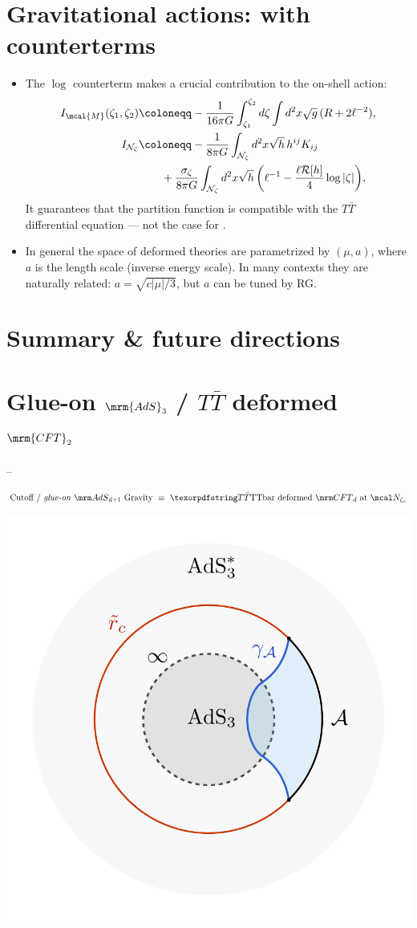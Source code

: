 \documentclass[11pt]{article}
\renewenvironment{frame}[1]%
	{\section*{#1}}%
	{}
\newcommand{\TTbar}{\texorpdfstring{\ensuremath{T\bar{T}}}{TTbar}\xspace}
\begin{document}
\begin{multicols}{3}
\begin{frame}{Gravitational actions: with counterterms}{%
	\textcite{Caputa:2020lpa,Li:2020zjb}
}
\begin{itemize}
\item The $\log$ counterterm makes a crucial contribution to the on-shell action:
	\begin{align*}
		I_{\mcal{M}}(\zeta_1, \zeta_2) & \coloneqq - \frac{1}{16\pi G} \int_{\zeta_1}^{\zeta_2} d\zeta \int d^2 x \sqrt{g} \, (R + 2 \ell^{-2}),  %
	\\
		I_{\mathcal N_{\zeta}} & \coloneqq  - \frac{1}{8\pi G} \int_{\mathcal N_{\zeta}} d^2x \sqrt{h}\,h^{ij} K_{ij} 
	\\& \qquad + \frac{\sigma_\zeta}{8\pi G} \int_{\mathcal N_{\zeta}} d^2x \sqrt{h} \, \bigg(\ell^{-1} - \frac{\ell  \mathcal{R}[h]}{4} \log |\zeta| \bigg), %
	\end{align*}
	It guarantees that the partition function is compatible with the $T\bar T$ differential equation --- not the case for \textsl{\citeauthor{Donnelly:2018bef}}.
	
	\item In general the space of deformed theories are parametrized by $(\mu,a)$, where $a$ is the length scale (inverse energy scale). In many contexts they are naturally related: $a = \sqrt{c|\mu|/3}$, but $a$ can be tuned by RG.
	
\end{itemize}
\end{frame}


\section{Summary \& future directions}

\section*{Glue-on $\mrm{AdS}_3$ / \TTbar deformed $\mrm{CFT}_2$}
\noindent
	\textcite{Apolo:2023vnm} -- 

\begin{equation*}
\stateGlueon
\end{equation*}

\begin{center}
	\includegraphics[width=.5\linewidth]{img/RT-AdS.pdf}
	\vspace{-1\baselineskip}
	

\end{center}
\end{multicols}
\end{document}
